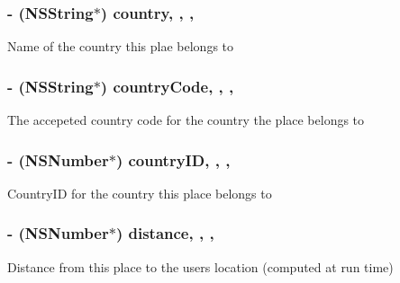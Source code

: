 \subsubsection[{\texorpdfstring{country}{country}}]{\setlength{\rightskip}{0pt plus 5cm}-\/ (N\+S\+String$\ast$) country\hspace{0.3cm}{\ttfamily [read]}, {\ttfamily [write]}, {\ttfamily [nonatomic]}, {\ttfamily [retain]}}\hypertarget{interface_place_object_a51fc9bf5128ad1ae37c7f8520f2f8f4e}{}\label{interface_place_object_a51fc9bf5128ad1ae37c7f8520f2f8f4e}
Name of the country this plae belongs to 
\subsubsection[{\texorpdfstring{country\+Code}{countryCode}}]{\setlength{\rightskip}{0pt plus 5cm}-\/ (N\+S\+String$\ast$) country\+Code\hspace{0.3cm}{\ttfamily [read]}, {\ttfamily [write]}, {\ttfamily [nonatomic]}, {\ttfamily [retain]}}\hypertarget{interface_place_object_ae97cadb12de29e5d532e7ebb17981cd0}{}\label{interface_place_object_ae97cadb12de29e5d532e7ebb17981cd0}
The accepeted country code for the country the place belongs to 
\subsubsection[{\texorpdfstring{country\+ID}{countryID}}]{\setlength{\rightskip}{0pt plus 5cm}-\/ (N\+S\+Number$\ast$) country\+ID\hspace{0.3cm}{\ttfamily [read]}, {\ttfamily [write]}, {\ttfamily [nonatomic]}, {\ttfamily [retain]}}\hypertarget{interface_place_object_a2c310e19df1c333e69ea623a07803159}{}\label{interface_place_object_a2c310e19df1c333e69ea623a07803159}
Country\+ID for the country this place belongs to 
\subsubsection[{\texorpdfstring{distance}{distance}}]{\setlength{\rightskip}{0pt plus 5cm}-\/ (N\+S\+Number$\ast$) distance\hspace{0.3cm}{\ttfamily [read]}, {\ttfamily [write]}, {\ttfamily [nonatomic]}, {\ttfamily [retain]}}\hypertarget{interface_place_object_a913be3e7487cc751bedf051efb200f0b}{}\label{interface_place_object_a913be3e7487cc751bedf051efb200f0b}
Distance from this place to the users location (computed at run time) 
